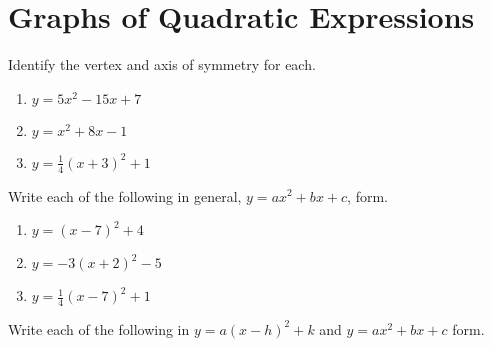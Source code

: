 \chapter{Graphs of Quadratic Expressions}

Identify the vertex and axis of symmetry for each.

\begin{multicols}{3}
\begin{enumerate}   
    \item $y = 5x^2 - 15x + 7$
    \item $y = x^2 + 8x - 1$
    \item $y = \frac{1}{4}\left(x+3\right)^2 + 1$
\end{enumerate} \setcounter{Review}{\value{enumi}}
\end{multicols}

Write each of the following in general, $y = ax^2 + bx + c$, form.

\begin{multicols}{3}
\begin{enumerate}   \setcounter{enumi}{\value{Review}}
    \item $y = (x-7)^2 + 4$
	\item $y = -3(x+2)^2-5$
	\item $y = \frac{1}{4}(x-7)^2+1$
\end{enumerate} \setcounter{Review}{\value{enumi}}
\end{multicols}

Write each of the following in $y = a(x-h)^2 + k$ and $y = ax^2 + bx + c$ form.

